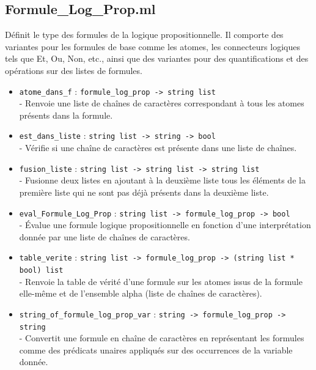 \documentclass{article}
\begin{document}
\subsection{\textbf{Formule\_Log\_Prop.ml}}
Définit le type des formules de la logique propositionnelle. Il comporte des variantes pour les formules de base comme les atomes, les connecteurs logiques tels que Et, Ou, Non, etc., ainsi que des variantes pour des quantifications et des opérations sur des listes de formules.

\begin{itemize}
\item
\texttt{atome\_dans\_f} : \texttt{formule\_log\_prop -> string list}\\
- Renvoie une liste de chaînes de caractères correspondant à tous les atomes présents dans la formule.

\item
\texttt{est\_dans\_liste} : \texttt{string list -> string -> bool}\\
- Vérifie si une chaîne de caractères est présente dans une liste de chaînes.

\item
\texttt{fusion\_liste} : \texttt{string list -> string list -> string list}\\
- Fusionne deux listes en ajoutant à la deuxième liste tous les éléments de la première liste qui ne sont pas déjà présents dans la deuxième liste.
\item
\texttt{eval\_Formule\_Log\_Prop} : \texttt{string list -> formule\_log\_prop -> bool}\\
- Évalue une formule logique propositionnelle en fonction d'une interprétation donnée par une liste de chaînes de caractères.

\item
\texttt{table\_verite} : \texttt{string list -> formule\_log\_prop -> (string list * bool) list}\\
- Renvoie la table de vérité d'une formule sur les atomes issus de la formule elle-même et de l'ensemble alpha (liste de chaînes de caractères).

\item
\texttt{string\_of\_formule\_log\_prop\_var} : \texttt{string -> formule\_log\_prop -> string}\\
- Convertit une formule en chaîne de caractères en représentant les formules comme des prédicats unaires appliqués sur des occurrences de la variable donnée.
\end{itemize}
\end{document}
